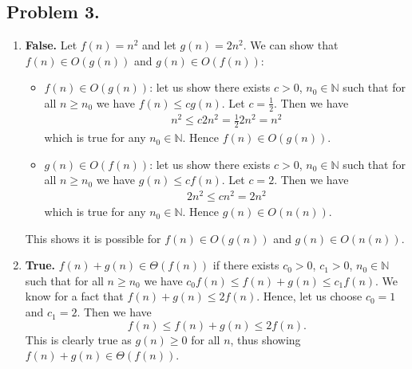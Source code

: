 \documentclass[11pt, letterpaper, titlepage]{article}
\begin{document}
\subsection*{Problem 3.}
\begin{enumerate}[label=\alph*)]
    \item \textbf{False.} Let $f(n) = n^2$ and let $g(n) = 2n^2$. We can show that $f(n) \in O(g(n))$ and $g(n) \in O(f(n))$:
    \begin{itemize}
        \item $f(n) \in O(g(n))$: let us show there exists $c > 0$, $n_0 \in \mathbb{N}$ such that for all $n \geq n_0$ we have $f(n) \leq cg(n)$. Let $c = \frac{1}{2}$. Then we have
        \begin{align}
            n^2 \leq c2n^2 = \frac{1}{2}2n^2 = n^2
        \end{align}
        which is true for any $n_0 \in \mathbb{N}$. Hence $f(n) \in O(g(n))$.

        \item $g(n) \in O(f(n))$: let us show there exists $c > 0$, $n_0 \in \mathbb{N}$ such that for all $n \geq n_0$ we have $g(n) \leq cf(n)$. Let $c = 2$. Then we have
        \begin{align}
            2n^2 \leq cn^2 = 2n^2
        \end{align}
        which is true for any $n_0 \in \mathbb{N}$. Hence $g(n) \in O(n(n))$.
    \end{itemize}
    This shows it is possible for $f(n) \in O(g(n))$ and $g(n) \in O(n(n))$.

    \item \textbf{True.} $f(n) + g(n) \in \Theta(f(n))$ if there exists $c_0 > 0$, $c_1 > 0$, $n_0 \in \mathbb{N}$ such that for all $n \geq n_0$ we have $c_0f(n) \leq f(n) + g(n) \leq c_1f(n)$. We know for a fact that $f(n) + g(n) \leq 2f(n)$. Hence, let us choose $c_0 = 1$ and $c_1 = 2$. Then we have 
    \begin{equation}
        f(n) \leq f(n) + g(n) \leq 2f(n).
    \end{equation}
    This is clearly true as $g(n) \geq 0$ for all $n$, thus showing $f(n) + g(n) \in \Theta(f(n))$.


\end{enumerate}
\end{document}
